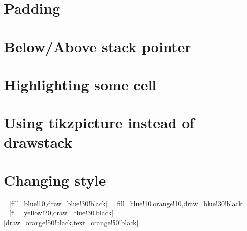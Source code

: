 \documentclass{article}
\begin{document}
\section{Padding}

\begin{drawstack}
\end{drawstack}

\section{Below/Above stack pointer}

\begin{drawstack}
   
\end{drawstack}

\section{Highlighting some cell}

\begin{drawstack}
   
\end{drawstack}

\section{Using tikzpicture instead of drawstack}

%
%


\section{Changing style}

{%
=[fill=blue!10,draw=blue!30!black]
=[fill=blue!10!orange!10,draw=blue!30!black]
=[fill=yellow!20,draw=blue!30!black]
=[draw=orange!50!black,text=orange!50!black]

\begin{drawstack}
   
\end{drawstack}
}
\end{document}
